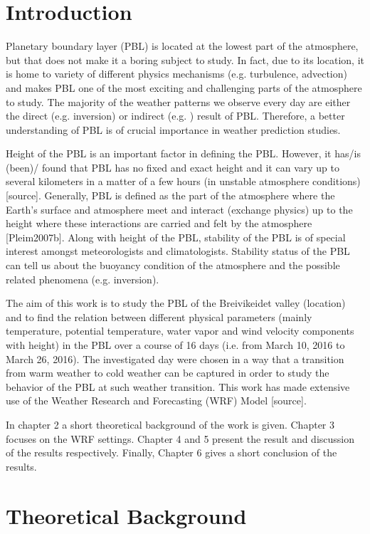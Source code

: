 \documentclass[a4paper,12pt]{article}
\numberwithin{equation}{section} %
\begin{document}
\section{Introduction}

Planetary boundary layer (PBL) is located at the lowest part of the atmosphere, but that does not make it a boring subject to study. In fact, due to its location, it is home to variety of different physics mechanisms (e.g. turbulence, advection) and makes PBL one of the most exciting and challenging parts of the atmosphere to study. The majority of the weather patterns we observe every day are either the direct (e.g. inversion) or indirect (e.g. ) result of PBL. Therefore, a better understanding of PBL is of crucial importance in weather prediction studies. 

Height of the PBL is an important factor in defining the PBL. However, it has/is (been)/ found that PBL has no fixed and exact height and it can vary up to several kilometers in a matter of a few hours (in unstable atmosphere conditions) [source]. Generally, PBL is defined as the part of the atmosphere where the Earth's surface and atmosphere meet and interact (exchange physics) up to the height where these interactions are carried and felt by the atmosphere [Pleim2007b]. Along with height of the PBL, stability of the PBL is of special interest amongst meteorologists and climatologists. Stability status of the PBL can tell us about the buoyancy condition of the atmosphere and the possible related phenomena (e.g. inversion).

The aim of this work is to study the PBL of the Breivikeidet valley (location) and to find the relation between different physical parameters (mainly temperature, potential temperature, water vapor and wind velocity components with height) in the PBL over a course of 16 days (i.e. from March 10, 2016 to March 26, 2016). The investigated day were chosen in a way that a transition from warm weather to cold weather can be captured in order to study the behavior of the PBL at such weather transition. This work has made extensive use of the Weather Research and Forecasting (WRF) Model [source].

In chapter 2 a short theoretical background of the work is given. Chapter 3 focuses on the WRF settings. Chapter 4 and 5 present the result and discussion of the results respectively. Finally, Chapter 6 gives a short conclusion of the results.

\section{Theoretical Background}
\end{document}
